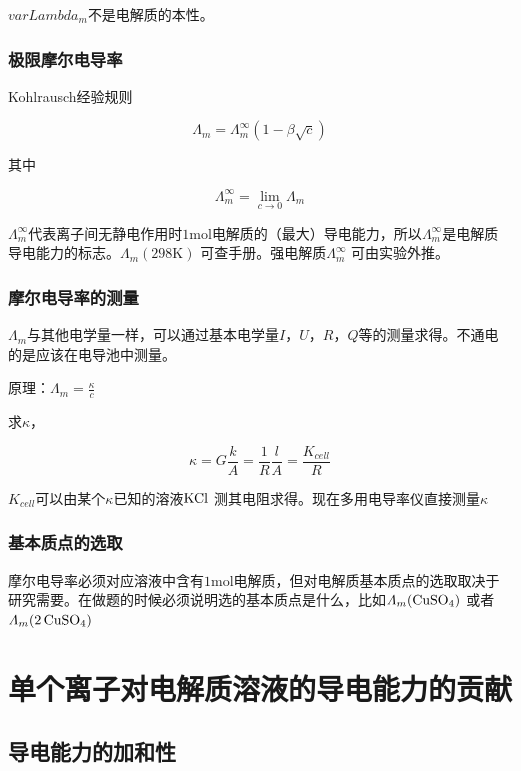 \documentclass[a4paper]{ctexrep}
\newcommand{\mol}{\mathrm{mol}}
\begin{document}
        $varLambda_m$不是电解质的本性。

        \subsubsection{极限摩尔电导率}

        Kohlrausch经验规则

        \[
            \varLambda_m = \varLambda_m^\infty (1 - \beta \sqrt{c})
        \]

        其中

        \[
            \varLambda_m^\infty = \lim_{c \rightarrow 0} \varLambda_m   
        \]

        $\varLambda_m^\infty$代表离子间无静电作用时$1 \mol$电解质的（最大）导电能力，所以$\Lambda_m ^\infty$是电解质导电能力的标志。$\varLambda_m (298\mathrm{K})$ 可查手册。强电解质$\varLambda_m^\infty$ 可由实验外推。

        \subsubsection{摩尔电导率的测量}

        $\varLambda_m$与其他电学量一样，可以通过基本电学量$I$，$U$，$R$，$Q$等的测量求得。不通电的是应该在电导池中测量。

        原理：$\varLambda_m = \frac{\kappa}{c} $

        求$\kappa$，
        
        \[
            \kappa = G \frac{k}{A} = \frac{1}{R} \frac{l}{A} = \frac{K_{cell}}{R}  
        \]

        $K_{cell}$可以由某个$\kappa$已知的溶液$\ce{KCl}$ 测其电阻求得。现在多用电导率仪直接测量$\kappa$

        \subsubsection{基本质点的选取}

        摩尔电导率必须对应溶液中含有$1 \mol$电解质，但对电解质基本质点的选取取决于研究需要。在做题的时候必须说明选的基本质点是什么，比如$\varLambda_m (\ce{CuSO4})$ 或者 $\varLambda_m (\ce{2CuSO4})$

        \section{单个离子对电解质溶液的导电能力的贡献}

        \subsection{导电能力的加和性}
\end{document}
